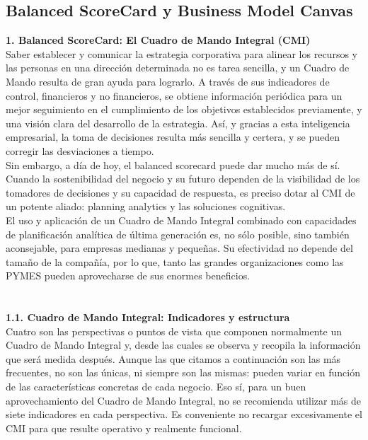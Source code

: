 \documentclass[twoside,twocolumn]{article}
\begin{document}
\begin{flushright}
\begin{itemize}
\section{Balanced ScoreCard y Business Model Canvas}

\textbf{1.  Balanced ScoreCard: El Cuadro de Mando Integral (CMI)}\\
Saber establecer y comunicar la estrategia corporativa para alinear los recursos y las personas en una dirección determinada no es tarea sencilla, y un Cuadro de Mando resulta de gran ayuda para lograrlo. A través de sus indicadores de control, financieros y no financieros, se obtiene información periódica para un mejor seguimiento en el cumplimiento de los objetivos establecidos previamente, y una visión clara del desarrollo de la estrategia. Así, y gracias a esta inteligencia empresarial, la toma de decisiones resulta más sencilla y certera, y se pueden corregir las desviaciones a tiempo.\\
Sin embargo, a día de hoy, el balanced scorecard puede dar mucho más de sí.
\textbf{}\\
Cuando la sostenibilidad del negocio y su futuro dependen de la visibilidad de los tomadores de decisiones y su capacidad de respuesta, es preciso dotar al CMI de un potente aliado: planning analytics y las soluciones cognitivas.\\
El uso y aplicación de un Cuadro de Mando Integral combinado con capacidades de planificación analítica de última generación es, no sólo posible, sino también aconsejable, para empresas medianas y pequeñas. Su efectividad no depende del tamaño de la compañía, por lo que, tanto las grandes organizaciones como las PYMES pueden aprovecharse de sus enormes beneficios.\\

\textbf{}\\\textbf{}\\
 \textbf{1.1.  Cuadro de Mando Integral: Indicadores y estructura }\\
Cuatro son las perspectivas o puntos de vista que componen normalmente un Cuadro de Mando Integral y, desde las cuales se observa y recopila la información que será medida después. Aunque las que citamos a continuación son las más frecuentes, no son las únicas, ni siempre son las mismas: pueden variar en función de las características concretas de cada negocio.
Eso sí, para un buen aprovechamiento del Cuadro de Mando Integral, no se recomienda utilizar más de siete indicadores en cada perspectiva. Es conveniente no recargar excesivamente el CMI para que resulte operativo y realmente funcional.\\
\textbf{}\\


\end{itemize}
\end{flushright}
\end{document}
